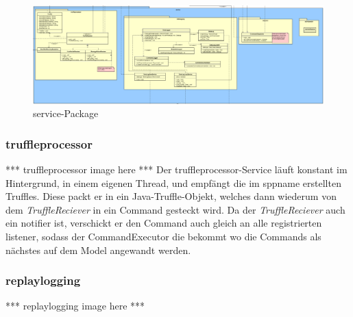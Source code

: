 \begin{figure}[H]
  \centering
  \includegraphics[width=\textwidth]{../diagramimages/service.png}
  \caption{service-Package}
  \medskip
\end{figure}

    \subsubsection{truffleprocessor}
    \label{subsubsec:truffleprocessor}

    *** truffleprocessor image here ***
    \newline
    \newline
    Der truffleprocessor-Service läuft konstant im Hintergrund, in einem eigenen Thread,
    und empfängt die im \gls{sppname} erstellten Truffles.
    Diese packt er in ein Java-Truffle-Objekt, welches dann wiederum von dem
    \textit{TruffleReciever} in ein Command gesteckt wird. Da der \textit{TruffleReciever}
    auch ein \gls{notifier} ist, verschickt er den Command auch gleich an
    alle registrierten \gls{listener}, sodass der CommandExecutor die bekommt wo die Commands
    als nächstes auf dem Model angewandt werden.

    \subsubsection{replaylogging}
    \label{subsubsec:replaylogging}

    *** replaylogging image here ***
    \newline
    \newline

